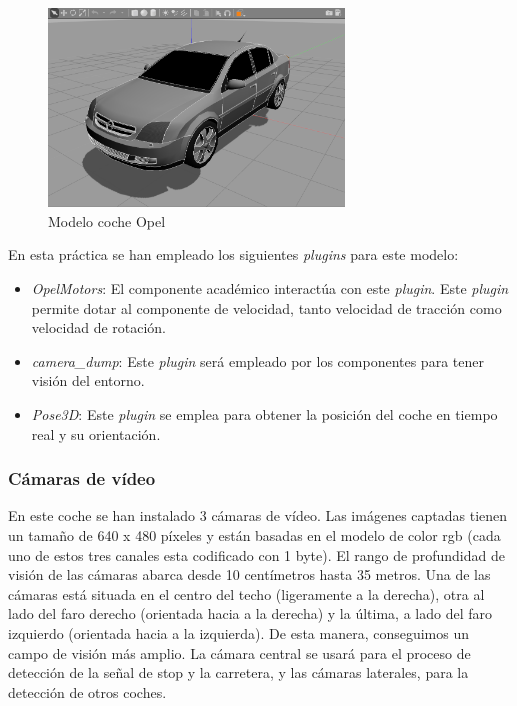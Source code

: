 \begin{figure}[H]
  \begin{center}
    \includegraphics[width=0.7\textwidth]{figures/Stop/cocheOpel.png}
		\caption{Modelo coche Opel}
		\label{fig.cocheOpel}
  \end{center}
\end{figure}

En esta práctica se han empleado los siguientes \textit{plugins} para este modelo:

\begin{itemize}
\item	\textit{OpelMotors}: El componente académico interactúa con este \textit{plugin}. Este \textit{plugin} permite dotar al componente de velocidad, tanto velocidad de tracción como velocidad de rotación.
\item	\textit{camera\_dump}: Este \textit{plugin} será empleado por los componentes para tener visión del entorno.
\item	\textit{Pose3D}: Este \textit{plugin} se emplea para obtener la posición del coche en tiempo real y su orientación.
\end{itemize}


\subsubsection{Cámaras de vídeo}
En este coche se han instalado 3 cámaras de vídeo. Las imágenes captadas tienen un tamaño de 640 x 480 píxeles y están basadas en el modelo de color \acrshort{rgb} (cada uno de estos tres canales esta codificado con 1 byte). El rango de profundidad de visión de las cámaras abarca desde 10 centímetros hasta 35 metros. Una de las cámaras está situada en el centro del techo (ligeramente a la derecha), otra al lado del faro derecho (orientada hacia a la derecha) y la última, a lado del faro izquierdo (orientada hacia a la izquierda). De esta manera, conseguimos un campo de visión más amplio. La cámara central se usará para el proceso de detección de la señal de stop y la carretera, y las cámaras laterales, para la detección de otros coches.

